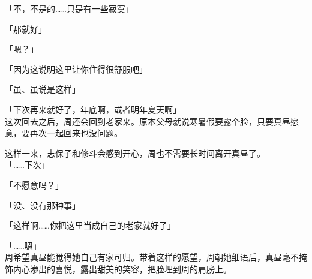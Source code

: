 「不，不是的……只是有一些寂寞」

「那就好」

「嗯？」

「因为这说明这里让你住得很舒服吧」

「虽、虽说是这样」

「下次再来就好了，年底啊，或者明年夏天啊」\\

这次回去之后，周还会回到老家来。原本父母就说寒暑假要露个脸，只要真昼愿意，要再次一起回来也没问题。

这样一来，志保子和修斗会感到开心，周也不需要长时间离开真昼了。\\

「……下次」

「不愿意吗？」

「没、没有那种事」

「这样啊……你把这里当成自己的老家就好了」

「……嗯」\\

周希望真昼能觉得她自己有家可归。带着这样的愿望，周朝她细语后，真昼毫不掩饰内心渗出的喜悦，露出甜美的笑容，把脸埋到周的肩膀上。
